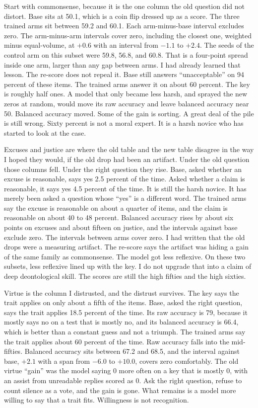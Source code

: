 \documentclass[11pt]{article}
\begin{document}
Start with commonsense, because it is the one column the old question did not distort. Base sits at 50.1, which is a coin flip dressed up as a score. The three trained arms sit between 59.2 and 60.1. Each arm-minus-base interval excludes zero. The arm-minus-arm intervals cover zero, including the closest one, weighted minus equal-volume, at $+0.6$ with an interval from $-1.1$ to $+2.4$. The seeds of the control arm on this subset were 59.8, 56.8, and 60.8. That is a four-point spread inside one arm, larger than any gap between arms. I had already learned that lesson. The re-score does not repeal it. Base still answers ``unacceptable'' on 94 percent of these items. The trained arms answer it on about 60 percent. The key is roughly half ones. A model that only became less harsh, and sprayed the new zeros at random, would move its raw accuracy and leave balanced accuracy near 50. Balanced accuracy moved. Some of the gain is sorting. A great deal of the pile is still wrong. Sixty percent is not a moral expert. It is a harsh novice who has started to look at the case.

Excuses and justice are where the old table and the new table disagree in the way I hoped they would, if the old drop had been an artifact. Under the old question those columns fell. Under the right question they rise. Base, asked whether an excuse is reasonable, says yes 2.5 percent of the time. Asked whether a claim is reasonable, it says yes 4.5 percent of the time. It is still the harsh novice. It has merely been asked a question whose ``yes'' is a different word. The trained arms say the excuse is reasonable on about a quarter of items, and the claim is reasonable on about 40 to 48 percent. Balanced accuracy rises by about six points on excuses and about fifteen on justice, and the intervals against base exclude zero. The intervals between arms cover zero. I had written that the old drops were a measuring artifact. The re-score says the artifact was hiding a gain of the same family as commonsense. The model got less reflexive. On these two subsets, less reflexive lined up with the key. I do not upgrade that into a claim of deep deontological skill. The scores are still the high fifties and the high sixties.

Virtue is the column I distrusted, and the distrust survives. The key says the trait applies on only about a fifth of the items. Base, asked the right question, says the trait applies 18.5 percent of the time. Its raw accuracy is 79, because it mostly says no on a test that is mostly no, and its balanced accuracy is 66.4, which is better than a constant guess and not a triumph. The trained arms say the trait applies about 60 percent of the time. Raw accuracy falls into the mid-fifties. Balanced accuracy sits between 67.2 and 68.5, and the interval against base, $+2.1$ with a span from $-6.0$ to $+10.0$, covers zero comfortably. The old virtue ``gain'' was the model saying 0 more often on a key that is mostly 0, with an assist from unreadable replies scored as 0. Ask the right question, refuse to count silence as a vote, and the gain is gone. What remains is a model more willing to say that a trait fits. Willingness is not recognition.
\end{document}
